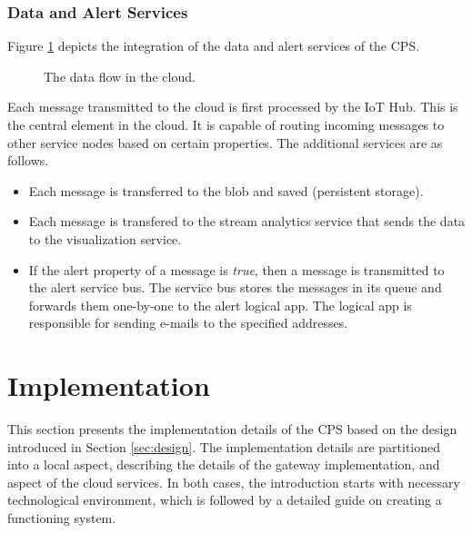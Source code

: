 \documentclass[a4paper, 11pt]{article}
\begin{document}
	\subsubsection{Data and Alert Services}
	
	Figure \ref{fig:cloud} depicts the integration of the data and alert services of the CPS.
		
	\begin{figure}[h!]
		\center
		\caption{The data flow in the cloud.}
		\label{fig:cloud}
	\end{figure}
	
	Each message transmitted to the cloud is first processed by the IoT Hub. This is the central element in the cloud. It is 	capable of routing incoming messages to other service nodes based on certain properties. The additional services are as follows.
	 \begin{itemize}
	 	\item Each message is transferred to the blob and saved (persistent storage).
		\item Each message is transfered to the stream analytics service that sends the data to the visualization service.
	 	\item If the alert property of a message is \textsl{true}, then a message is transmitted to the alert service bus. The service bus stores the messages in its queue and forwards them one-by-one to the alert logical app. The logical app is responsible for sending e-mails to the specified addresses.
	 \end{itemize}
	
	\section{Implementation}
	\label{sec:implementation}
	This section presents the implementation details of the CPS based on the design introduced in Section \ref{sec:design}. The implementation details are partitioned into a local aspect, describing the details of the gateway implementation, and aspect of the cloud services. In both cases, the introduction starts with necessary technological environment, which is followed by a detailed guide on creating a functioning system.
	
\end{document}
